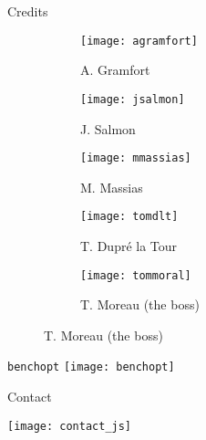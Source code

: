 \documentclass[unknownkeysallowed]{beamer}
\begin{document}
\begin{frame}{Credits}
\begin{figure}
     \centering
     \begin{subfigure}[b]{0.188\textwidth}
         \centering
         \texttt{[image: agramfort]}
         \caption{A. Gramfort}
     \end{subfigure}
     \hfill
     \begin{subfigure}[b]{0.188\textwidth}
         \centering
		\texttt{[image: jsalmon]}
         \caption{J. Salmon}
     \end{subfigure}
	 \hfill
     \begin{subfigure}[b]{0.188\textwidth}
         \centering
		 \texttt{[image: mmassias]}
         \caption{M. Massias}
     \end{subfigure}
     \hfill
     \begin{subfigure}[b]{0.188\textwidth}
         \centering
		\texttt{[image: tomdlt]}
        \caption{T. Dupré la Tour}
     \end{subfigure}
	 \hfill
     \begin{subfigure}[b]{0.188\textwidth}
         \centering
		\texttt{[image: tommoral]}
        \caption{T. Moreau (the boss)}
     \end{subfigure}
\end{figure}
\end{frame}


\begin{frame}{\texttt{benchopt}}
    \centering
    \texttt{[image: benchopt]}\\
\end{frame}


\begin{frame}{Contact}

\vspace{0.4cm}
\centering
\texttt{[image: contact\_js]}
\end{frame}



\end{document}
